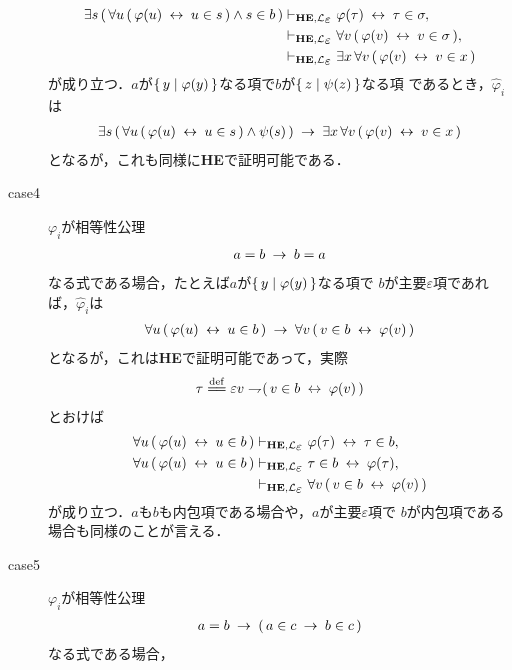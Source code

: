 \begin{metaprf}
\begin{description}
\begin{align}
					\exists s\, (\, \forall u\, (\, \varphi(u) \lrarrow u \in s\, )
					\wedge s \in b\, )
					&\provable{\mbox{{\bf HE}},\lang{\varepsilon}} \varphi(\tau) \lrarrow \tau \in \sigma, \\
					&\provable{\mbox{{\bf HE}},\lang{\varepsilon}} \forall v\, (\, \varphi(v) \lrarrow v \in \sigma\, ), \\
					&\provable{\mbox{{\bf HE}},\lang{\varepsilon}} \exists x\, \forall v\, (\, \varphi(v) \lrarrow v \in x\, )
				\end{align}
				が成り立つ．$a$が$\{\, y \mid \varphi(y)\, \}$なる項で$b$が$\{\, z \mid \psi(z)\, \}$なる項
				であるとき，$\hat{\varphi}_{i}$は
				\begin{align}
					\exists s\, (\, \forall u\, (\, \varphi(u) \hspace{0.25em}\leftrightarrow\hspace{0.25em} u \in s\, )
					\wedge \psi(s)\, ) \hspace{0.25em}\rightarrow\hspace{0.25em} \exists x\, \forall v\, (\, \varphi(v) \hspace{0.25em}\leftrightarrow\hspace{0.25em} v \in x\, )
				\end{align}
				となるが，これも同様に{\bf HE}で証明可能である．
				
			\item[case4] $\varphi_{i}$が相等性公理
				\begin{align}
					a = b \hspace{0.25em}\rightarrow\hspace{0.25em} b = a
				\end{align}
				なる式である場合，たとえば$a$が$\{\, y \mid \varphi(y)\, \}$なる項で
				$b$が主要$\varepsilon$項であれば，$\hat{\varphi}_{i}$は
				\begin{align}
					\forall u\, (\, \varphi(u) \hspace{0.25em}\leftrightarrow\hspace{0.25em} u \in b\, ) 
					\hspace{0.25em}\rightarrow\hspace{0.25em} \forall v\, (\, v \in b \hspace{0.25em}\leftrightarrow\hspace{0.25em} \varphi(v)\, ) 
				\end{align}
				となるが，これは{\bf HE}で証明可能であって，実際
				\begin{align}
					\tau \defeq \varepsilon v \negation (\, v \in b \lrarrow \varphi(v)\, )
				\end{align}
				とおけば
				\begin{align}
					\forall u\, (\, \varphi(u) \lrarrow u \in b\, ) 
					&\provable{\mbox{{\bf HE}},\lang{\varepsilon}} \varphi(\tau) \lrarrow \tau \in b, \\
					\forall u\, (\, \varphi(u) \lrarrow u \in b\, ) 
					&\provable{\mbox{{\bf HE}},\lang{\varepsilon}} \tau \in b \lrarrow \varphi(\tau), \\
					&\provable{\mbox{{\bf HE}},\lang{\varepsilon}} \forall v\, (\, v \in b \lrarrow \varphi(v)\, )
				\end{align}
				が成り立つ．$a$も$b$も内包項である場合や，$a$が主要$\varepsilon$項で
				$b$が内包項である場合も同様のことが言える．
			
			\item[case5] $\varphi_{i}$が相等性公理
				\begin{align}
					a = b \hspace{0.25em}\rightarrow\hspace{0.25em} (\, a \in c \hspace{0.25em}\rightarrow\hspace{0.25em} b \in c\, )
				\end{align}
				なる式である場合，
		\end{description}
	\end{metaprf}